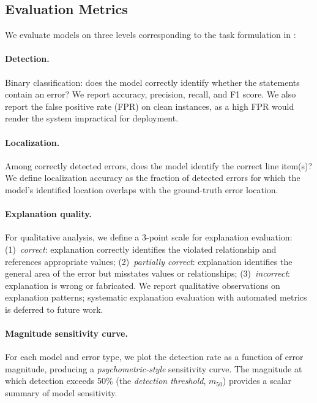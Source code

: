 \documentclass[11pt]{article}
\begin{document}
\subsection{Evaluation Metrics}
\label{sec:metrics}

We evaluate models on three levels corresponding to the task formulation in :

\paragraph{Detection.}
Binary classification: does the model correctly identify whether the statements contain an error?
We report accuracy, precision, recall, and F1 score.
We also report the false positive rate (FPR) on clean instances, as a high FPR would render the system impractical for deployment.

\paragraph{Localization.}
Among correctly detected errors, does the model identify the correct line item(s)?
We define localization accuracy as the fraction of detected errors for which the model's identified location overlaps with the ground-truth error location.

\paragraph{Explanation quality.}
For qualitative analysis, we define a 3-point scale for explanation evaluation:
(1)~\emph{correct}: explanation correctly identifies the violated relationship and references appropriate values;
(2)~\emph{partially correct}: explanation identifies the general area of the error but misstates values or relationships;
(3)~\emph{incorrect}: explanation is wrong or fabricated.
We report qualitative observations on explanation patterns; systematic explanation evaluation with automated metrics is deferred to future work.

\paragraph{Magnitude sensitivity curve.}
For each model and error type, we plot the detection rate as a function of error magnitude, producing a \emph{psychometric-style} sensitivity curve.
The magnitude at which detection exceeds 50\% (the \emph{detection threshold}, $m_{50}$) provides a scalar summary of model sensitivity.
\end{document}
